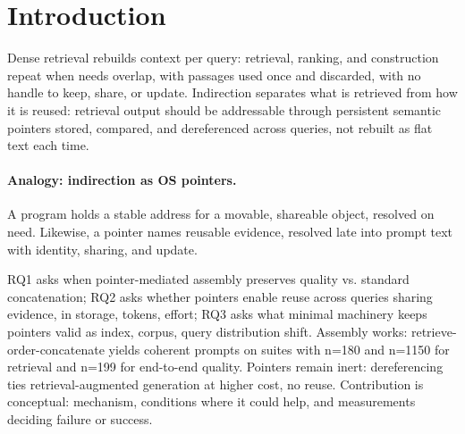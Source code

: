 \section{Introduction}
\label{sec:c-intro}

Dense retrieval rebuilds context per query: retrieval, ranking, and construction repeat when needs overlap, with passages used once and discarded, with no handle to keep, share, or update. Indirection separates what is retrieved from how it is reused: retrieval output should be addressable through persistent semantic pointers stored, compared, and dereferenced across queries, not rebuilt as flat text each time.

\paragraph{Analogy: indirection as OS pointers.} A program holds a stable address for a movable, shareable object, resolved on need. Likewise, a pointer names reusable evidence, resolved late into prompt text with identity, sharing, and update.

RQ1 asks when pointer-mediated assembly preserves quality vs. standard concatenation; RQ2 asks whether pointers enable reuse across queries sharing evidence, in storage, tokens, effort; RQ3 asks what minimal machinery keeps pointers valid as index, corpus, query distribution shift. Assembly works: retrieve-order-concatenate yields coherent prompts on suites with n=180 and n=1150 for retrieval and n=199 for end-to-end quality. Pointers remain inert: dereferencing ties retrieval-augmented generation at higher cost, no reuse. Contribution is conceptual: mechanism, conditions where it could help, and measurements deciding failure or success.
